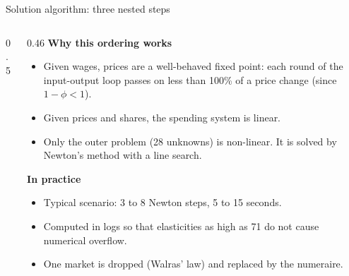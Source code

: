 \documentclass[aspectratio=169,9pt,t]{beamer}
\newcommand{\h}[1]{\hat{#1}}
\begin{document}
\begin{frame}{Solution algorithm: three nested steps}
  \begin{columns}[T]
    \begin{column}{0.5\textwidth}
      \centering
    \end{column}
    \begin{column}{0.46\textwidth}
      \small
      \textbf{Why this ordering works}
      \begin{itemize}
        \item Given wages, prices are a well-behaved fixed point: each
              round of the input-output loop passes on less than 100\%
              of a price change (since $1-\phi<1$).
        \item Given prices and shares, the spending system is linear.
        \item Only the outer problem (28 unknowns) is non-linear. It is
              solved by Newton's method with a line search.
      \end{itemize}
      \textbf{In practice}
      \begin{itemize}
        \item Typical scenario: 3 to 8 Newton steps, 5 to 15 seconds.
        \item Computed in logs so that elasticities as high as 71 do not
              cause numerical overflow.
        \item One market is dropped (Walras' law) and replaced by the
              numeraire.
      \end{itemize}
    \end{column}
  \end{columns}
\end{frame}
\end{document}
